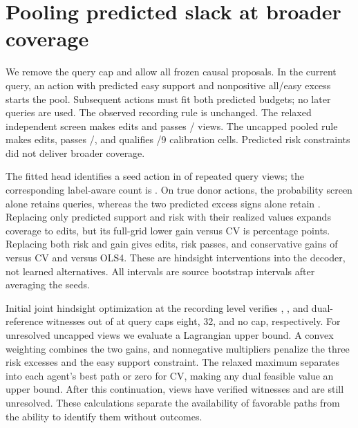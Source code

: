 \section{Pooling predicted slack at broader coverage}
We remove the query cap and allow all frozen causal proposals. In the
current query, an action with predicted easy support and nonpositive
all/easy excess starts the pool. Subsequent actions must fit both
predicted budgets; no later queries are used. The observed recording
rule is unchanged. The relaxed independent screen makes
\CoveragePoolMarginalEdits{} edits and passes \CoveragePoolMarginalPass{}/\CoveragePoolViews{}
views. The uncapped pooled rule makes \CoveragePoolEdits{} edits, passes
\CoveragePoolPass{}/\CoveragePoolViews{}, and qualifies \CoveragePoolQual{}/9 calibration
cells. Predicted risk constraints did not deliver broader coverage.

The fitted head identifies a seed action in \CoveragePoolEstimatedDonor{}
of \CoveragePoolQueries{} repeated query views; the corresponding label-aware
count is \CoveragePoolTrueDonor{}. On true donor actions, the probability
screen alone retains \CoveragePoolProbability{} queries, whereas the two
predicted excess signs alone retain \CoveragePoolBothCosts{}.
Replacing only predicted support and risk
with their realized values expands coverage to \CoveragePoolRiskOnlyEdits{}
edits, but its full-grid lower gain versus CV is \CoveragePoolTrueRiskCV{}
percentage points. Replacing both risk and gain gives
\CoveragePoolRiskGainEdits{} edits, \CoveragePoolTruePass{} risk passes,
and conservative gains of \CoveragePoolTrueBothCV{} versus CV and
\CoveragePoolTrueBothOLS{} versus OLS4. These are hindsight interventions
into the decoder, not learned alternatives. All intervals are source
bootstrap intervals after averaging the seeds.

Initial joint hindsight optimization at the recording level verifies
\CoveragePoolCapEight{}, \CoveragePoolCapWide{}, and \CoveragePoolUncappedInitial{} dual-reference
witnesses out of \CoveragePoolViews{} at query caps eight, 32, and no cap,
respectively. For unresolved uncapped views we evaluate a Lagrangian
upper bound. A convex weighting combines the two gains, and nonnegative
multipliers penalize the three risk excesses and the easy support
constraint. The relaxed maximum separates into each agent's best path
or zero for CV, making any dual feasible value an upper bound. After
this continuation, \CoveragePoolUncapped{} views have verified witnesses and
\CoveragePoolUnresolved{} are still unresolved.
These calculations separate the availability of favorable paths from
the ability to identify them without outcomes.
